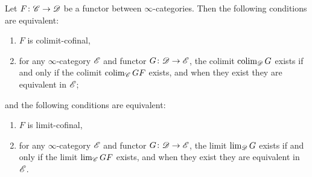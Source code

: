 \documentclass[../../thesis.tex]{subfiles}
\begin{document}
\begin{corollary}
    Let $F \colon \mathscr{C} \to \mathscr{D}$ be a functor between $\infty$-categories.
    Then the following conditions are equivalent:
    \begin{enumerate}
        \item $F$ is colimit-cofinal,
        \item for any $\infty$-category $\mathscr{E}$ and functor $G\colon\mathscr{D}\to\mathscr{E}$, the colimit $\operatorname{colim}_{\mathscr{D}}G$ exists if and only if the colimit $\operatorname{colim}_{\mathscr{C}}GF$ exists, and when they exist they are equivalent in $\mathscr{E}$;
    \end{enumerate}
    and the following conditions are equivalent:
    \begin{enumerate}
        \item $F$ is limit-cofinal,
        \item for any $\infty$-category $\mathscr{E}$ and functor $G\colon\mathscr{D}\to\mathscr{E}$, the limit $\lim_{\mathscr{D}}G$ exists if and only if the limit $\lim_{\mathscr{C}}GF$ exists, and when they exist they are equivalent in $\mathscr{E}$.
    \end{enumerate}
\end{corollary}
\end{document}
